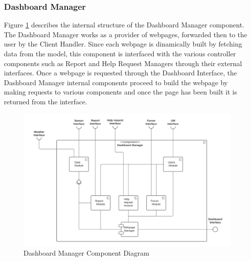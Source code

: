 \documentclass[10pt]{article} %
\begin{document}
\subsubsection{Dashboard Manager}
Figure \ref{fig:dashboard_manager} describes the internal structure of the Dashboard Manager component. The Dashboard Manager works as a provider of webpages, forwarded then to 
the user by the Client Handler. Since each webpage is dinamically built by fetching data from the model, this component is interfaced with the various controller components such as Report and Help Request Managers through
their external interfaces. Once a webpage is requested through the Dashboard Interface, the Dashboard Manager internal components proceed to build the webpage by making requests to various components
and once the page has been built it is returned from the interface.
\begin{figure}[h]
    \centering 
    \centerline{\includegraphics[scale=0.55]{images/dashboardManager.png}}
    \caption{Dashboard Manager Component Diagram}
    \label{fig:dashboard_manager}
\end{figure}
\newpage
\end{document}
